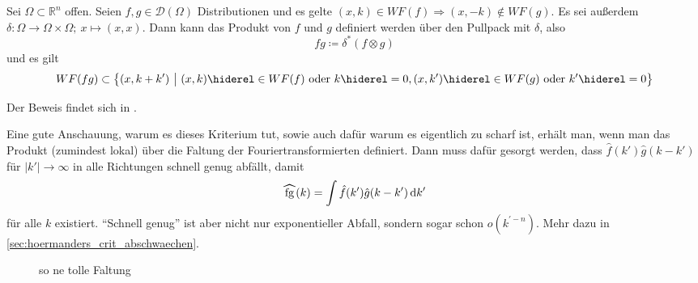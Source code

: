 \begin{theorem}
\label{thm:hoermanders_criterion}
    Sei $\Omega \subset \mathbb{R}^n$ offen.
    Seien $f,g \in \mathcal{D}(\Omega)$ Distributionen und es gelte $(x,k) \in WF(f) \Rightarrow (x,-k) \notin WF(g)$. Es sei außerdem $\delta : \Omega \rightarrow \Omega \times \Omega; ~x \mapsto (x,x)$. Dann kann das Produkt von $f$ und $g$ definiert werden über den Pullpack mit $\delta$, also
    \begin{equation*}
        f g \coloneqq \delta^* (f \otimes g)
    \end{equation*}
    und es gilt
    \begin{dmath*}
        WF(fg) \subset \left\{(x,k+k') ~\big|~ (x,k) \hiderel\in WF(f) \textrm{ oder } k \hiderel = 0,\\ (x,k') \hiderel\in WF(g) \textrm{ oder } k'\hiderel=0 \right\}
    \end{dmath*}
\end{theorem}

Der Beweis findet sich in \textcite{Hoermander1985}.

Eine gute Anschauung, warum es dieses Kriterium tut, sowie auch dafür warum es eigentlich zu scharf ist, erhält man, wenn man das Produkt (zumindest lokal) über die Faltung der Fouriertransformierten definiert. Dann muss dafür gesorgt werden, dass $\hat f(k') \hat g(k-k')$ für $|k'| \to \infty$ in alle Richtungen schnell genug abfällt, damit
\begin{equation*}
    \rwhat{fg}(k) = \int \hat f(k') \hat g(k-k') \d k'
\end{equation*}
für alle $k$ existiert. "`Schnell genug"' ist aber nicht nur exponentieller Abfall, sondern sogar schon $o(k^{\prime -n})$. Mehr dazu in \cref{sec:hoermanders_crit_abschwaechen}.


\begin{figure}
\caption{so ne tolle Faltung}
\label{fig:faltung_strahlen}
\end{figure}

